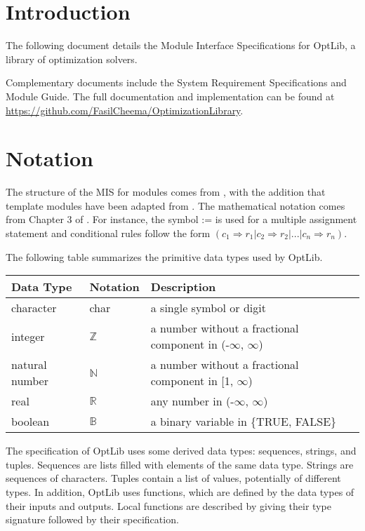 \documentclass[12pt, titlepage]{article}
\begin{document}
\tableofcontents

\newpage


\section{Introduction}

The following document details the Module Interface Specifications for OptLib, a library of optimization solvers.

Complementary documents include the System Requirement Specifications
and Module Guide.  The full documentation and implementation can be
found at \url{https://github.com/FasilCheema/OptimizationLibrary}.

\section{Notation}
The structure of the MIS for modules comes from \citet{HoffmanAndStrooper1995},
with the addition that template modules have been adapted from
\cite{GhezziEtAl2003}.  The mathematical notation comes from Chapter 3 of
\citet{HoffmanAndStrooper1995}.  For instance, the symbol := is used for a
multiple assignment statement and conditional rules follow the form $(c_1
\Rightarrow r_1 | c_2 \Rightarrow r_2 | ... | c_n \Rightarrow r_n )$.

The following table summarizes the primitive data types used by OptLib. 

\begin{center}
\renewcommand{\arraystretch}{1.2}
\noindent 
\begin{tabular}{l l p{7.5cm}} 
\toprule 
\textbf{Data Type} & \textbf{Notation} & \textbf{Description}\\ 
\midrule
character & char & a single symbol or digit\\
integer & $\mathbb{Z}$ & a number without a fractional component in (-$\infty$, $\infty$) \\
natural number & $\mathbb{N}$ & a number without a fractional component in [1, $\infty$) \\
real & $\mathbb{R}$ & any number in (-$\infty$, $\infty$)\\
boolean & $\mathbb{B}$ & a binary variable in \{TRUE, FALSE\}\\
\bottomrule
\end{tabular} 
\end{center}

\noindent
The specification of OptLib uses some derived data types: sequences, strings, and
tuples. Sequences are lists filled with elements of the same data type. Strings
are sequences of characters. Tuples contain a list of values, potentially of
different types. In addition, OptLib uses functions, which
are defined by the data types of their inputs and outputs. Local functions are
described by giving their type signature followed by their specification.
\end{document}
